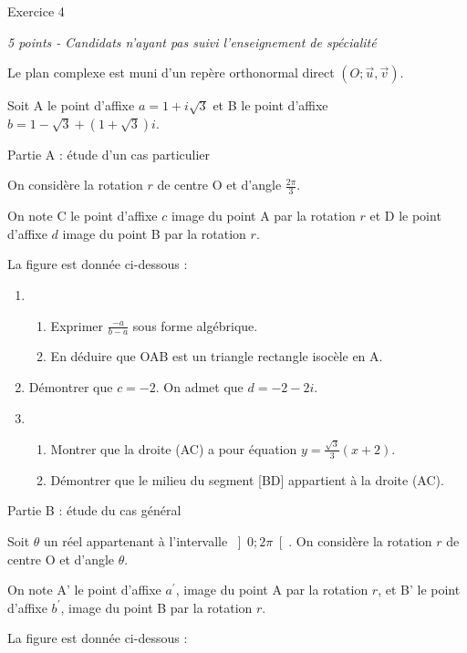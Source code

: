 
%
\begin{h2}Exercice 4\end{h2}
\textit{5 points - Candidats n'ayant pas suivi l'enseignement de spécialité }
\par
Le plan complexe est muni d'un repère orthonormal direct $\left(O; \vec{u}, \vec{v}\right)$.
\par
Soit A le point d'affixe $a=1+i\sqrt{3}$ et B le point d'affixe $b=1-\sqrt{3}+\left(1+\sqrt{3}\right)i$.
\begin{h3}Partie A : étude d'un cas particulier\end{h3}
On considère la rotation $r$ de centre O et d'angle $\frac{2\pi }{3}$.
\par
On note C le point d'affixe $c$ image du point A par la rotation $r$ et D le point d'affixe $d$ image du point B par la rotation $r$.
\par
La figure est donnée ci-dessous :

\begin{center}
\end{center}
\begin{enumerate}
     \item
     \begin{enumerate}[label=\alph*.]
          \item
          Exprimer $\frac{- a}{b-a}$ sous forme algébrique.
          \item
          En déduire que OAB est un triangle rectangle isocèle en A.
     \end{enumerate}
     \item
     Démontrer que $c=-2$. On admet que $d=-2-2i$.
     \item
     \begin{enumerate}[label=\alph*.]
          \item
          Montrer que la droite (AC) a pour équation $y=\frac{\sqrt{3}}{3}\left(x+ 2\right)$.
          \item
          Démontrer que le milieu du segment [BD] appartient à la droite (AC).
     \end{enumerate}
\end{enumerate}
\begin{h3}Partie B : étude du cas général\end{h3}
Soit $\theta $ un réel appartenant à l'intervalle $\left]0; 2\pi \right[$. On considère la rotation $r$ de centre O et d'angle $\theta $.
\par
On note A' le point d'affixe $a^{\prime}$, image du point A par la rotation $r$, et B' le point d'affixe $b^{\prime}$, image du point B par la rotation $r$.
\par
La figure est donnée ci-dessous :

